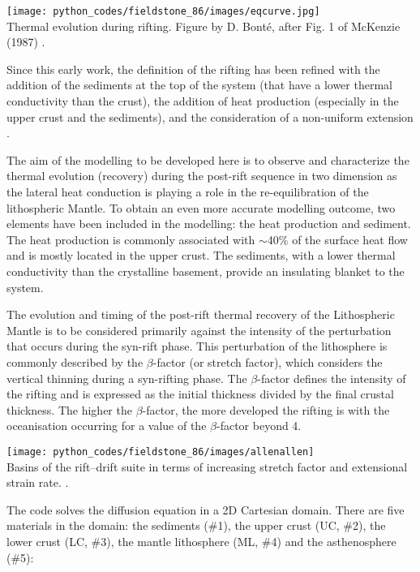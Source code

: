 \begin{center}
\texttt{[image: python\_codes/fieldstone\_86/images/eqcurve.jpg]}\\
{\captionfont Thermal evolution during rifting. 
Figure by D. Bont{\'e}, after Fig. 1 of McKenzie (1987) \cite{mcke78}.}
\end{center}

Since this early work, the definition of the rifting has been 
refined with the addition of the sediments at the top of the system 
(that have a lower thermal conductivity than the crust), 
the addition of heat production (especially in the upper crust and the sediments), 
and the consideration of a non-uniform extension \cite{roke80}.

The aim of the modelling to be developed here is to observe and characterize the thermal 
evolution (recovery) during the post-rift sequence in two dimension as the lateral heat 
conduction is playing a role in the re-equilibration of the lithospheric Mantle. To obtain 
an even more accurate modelling outcome, two elements have been included in the modelling: 
the heat production and sediment. The heat production is commonly associated with $\sim$40\% 
of the surface heat flow and is mostly located in the upper crust. The sediments, with a lower thermal 
conductivity than the crystalline basement, provide an insulating blanket to the system. 

The evolution and timing of the post-rift  thermal recovery of the Lithospheric Mantle 
is to be considered primarily against the intensity of the perturbation that occurs during 
the syn-rift phase. This perturbation of the lithosphere is commonly described by 
the $\beta$-factor (or stretch factor), which considers the vertical thinning during 
a syn-rifting phase. The $\beta$-factor defines the intensity of the rifting and 
is expressed as the initial thickness divided by the final crustal thickness. 
The higher the $\beta$-factor, the more developed the rifting is with the oceanisation 
occurring for a value of the $\beta$-factor beyond 4.

\begin{center}
\texttt{[image: python\_codes/fieldstone\_86/images/allenallen]}\\
{\captionfont Basins of the rift–drift suite in terms of increasing stretch factor 
and extensional strain rate. \cite{allen2013}.} 
\end{center}

The code solves the diffusion equation in a 2D Cartesian domain. There are 
five materials in the domain: the sediments (\#1), the upper crust (UC, \#2), 
the lower crust (LC, \#3), the mantle lithosphere (ML, \#4) and the asthenosphere (\#5):


